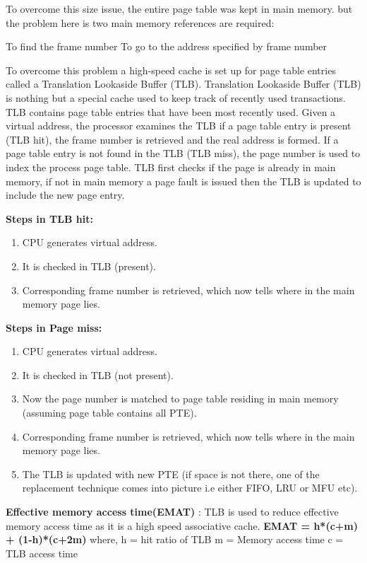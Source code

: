 \documentclass[8pt,landscape]{article}
\begin{document}
\begin{multicols}{3}
\begin{tiny}
To overcome this size issue, the entire page table was kept in main memory. but the problem here is two main memory references are required:

    To find the frame number
    To go to the address specified by frame number

To overcome this problem a high-speed cache is set up for page table entries called a Translation Lookaside Buffer (TLB). Translation Lookaside Buffer (TLB) is nothing but a special cache used to keep track of recently used transactions. TLB contains page table entries that have been most recently used. Given a virtual address, the processor examines the TLB if a page table entry is present (TLB hit), the frame number is retrieved and the real address is formed. If a page table entry is not found in the TLB (TLB miss), the page number is used to index the process page table. TLB first checks if the page is already in main memory, if not in main memory a page fault is issued then the TLB is updated to include the new page entry.


\textbf{Steps in TLB hit:}
\begin{enumerate}[noitemsep]
	\item CPU generates virtual address.
    \item It is checked in TLB (present).
    \item Corresponding frame number is retrieved, which now tells where in the main memory page lies.
\end{enumerate}

\textbf{Steps in Page miss:}
\begin{enumerate}[noitemsep]
	\item CPU generates virtual address.
    \item It is checked in TLB (not present).
    \item Now the page number is matched to page table residing in main memory (assuming page table contains all PTE).
    \item Corresponding frame number is retrieved, which now tells where in the main memory page lies.
    \item The TLB is updated with new PTE (if space is not there, one of the replacement technique comes into picture i.e either FIFO, LRU or MFU etc).
\end{enumerate}

\textbf{Effective memory access time(EMAT)} : TLB is used to reduce effective memory access time as it is a high speed associative cache.
\textbf{EMAT = h*(c+m) + (1-h)*(c+2m)}
where, h = hit ratio of TLB
m = Memory access time
c = TLB access time 






\end{tiny}
\end{multicols}
\end{document}
